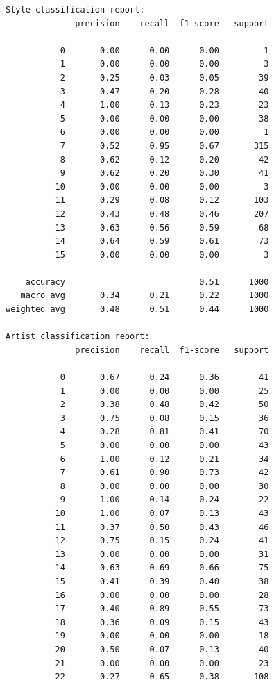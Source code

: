 \documentclass[11pt]{article}
\begin{document}
    
    \begin{Verbatim}[commandchars=\\\{\}]
Style classification report:
              precision    recall  f1-score   support

           0       0.00      0.00      0.00         1
           1       0.00      0.00      0.00         3
           2       0.25      0.03      0.05        39
           3       0.47      0.20      0.28        40
           4       1.00      0.13      0.23        23
           5       0.00      0.00      0.00        38
           6       0.00      0.00      0.00         1
           7       0.52      0.95      0.67       315
           8       0.62      0.12      0.20        42
           9       0.62      0.20      0.30        41
          10       0.00      0.00      0.00         3
          11       0.29      0.08      0.12       103
          12       0.43      0.48      0.46       207
          13       0.63      0.56      0.59        68
          14       0.64      0.59      0.61        73
          15       0.00      0.00      0.00         3

    accuracy                           0.51      1000
   macro avg       0.34      0.21      0.22      1000
weighted avg       0.48      0.51      0.44      1000

Artist classification report:
              precision    recall  f1-score   support

           0       0.67      0.24      0.36        41
           1       0.00      0.00      0.00        25
           2       0.38      0.48      0.42        50
           3       0.75      0.08      0.15        36
           4       0.28      0.81      0.41        70
           5       0.00      0.00      0.00        43
           6       1.00      0.12      0.21        34
           7       0.61      0.90      0.73        42
           8       0.00      0.00      0.00        30
           9       1.00      0.14      0.24        22
          10       1.00      0.07      0.13        43
          11       0.37      0.50      0.43        46
          12       0.75      0.15      0.24        41
          13       0.00      0.00      0.00        31
          14       0.63      0.69      0.66        75
          15       0.41      0.39      0.40        38
          16       0.00      0.00      0.00        28
          17       0.40      0.89      0.55        73
          18       0.36      0.09      0.15        43
          19       0.00      0.00      0.00        18
          20       0.50      0.07      0.13        40
          21       0.00      0.00      0.00        23
          22       0.27      0.65      0.38       108


\end{Verbatim}
\end{document}
